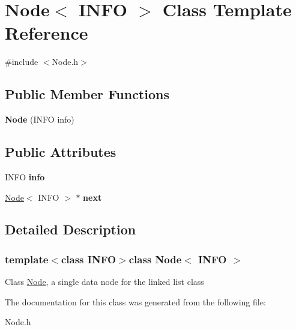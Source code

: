 \hypertarget{class_node}{\section{Node$<$ I\-N\-F\-O $>$ Class Template Reference}
\label{class_node}
}


{\ttfamily \#include $<$Node.\-h$>$}

\subsection*{Public Member Functions}
\begin{DoxyCompactItemize}
\item 
\hypertarget{class_node_a2b3d30cc34b4a4cad016522ee5266c47}{{\bfseries Node} (I\-N\-F\-O info)}\label{class_node_a2b3d30cc34b4a4cad016522ee5266c47}

\end{DoxyCompactItemize}
\subsection*{Public Attributes}
\begin{DoxyCompactItemize}
\item 
\hypertarget{class_node_a4b689df2425ba17ade3a920fd993f7b0}{I\-N\-F\-O {\bfseries info}}\label{class_node_a4b689df2425ba17ade3a920fd993f7b0}

\item 
\hypertarget{class_node_a843a1f2c5c368defc9c6090fd8777efd}{\hyperlink{class_node}{Node}$<$ I\-N\-F\-O $>$ $\ast$ {\bfseries next}}\label{class_node_a843a1f2c5c368defc9c6090fd8777efd}

\end{DoxyCompactItemize}


\subsection{Detailed Description}
\subsubsection*{template$<$class I\-N\-F\-O$>$class Node$<$ I\-N\-F\-O $>$}

Class \hyperlink{class_node}{Node}, a single data node for the linked list class 

The documentation for this class was generated from the following file\-:\begin{DoxyCompactItemize}
\item 
Node.\-h\end{DoxyCompactItemize}
